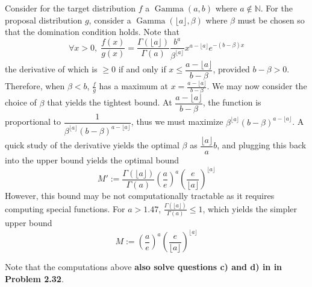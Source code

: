 \documentclass[a4paper,11pt]{article}
\begin{document}
\begin{enumerate}[label=(\alph*)]
  Consider for the target distribution $f$ a $\operatorname{Gamma}(a,b)$ where $a\notin \mathbb N$. For the proposal distribution $g$, consider a $\operatorname{Gamma}(\lfloor a \rfloor,\beta)$ where $\beta$ must be chosen so that the domination condition holds. Note that $$\forall x>0,\;\frac{f(x)}{g(x)}=\frac{\Gamma(\lfloor a \rfloor)}{\Gamma(a)}\frac{b^a}{\beta^{\lfloor a \rfloor}}x^{a-\lfloor a \rfloor}e^{-(b-\beta)x}$$ the derivative of which is $\geq 0$ if and only if $x\leq \dfrac{a-\lfloor a \rfloor}{b-\beta}$, provided $b-\beta >0$. Therefore, when $\beta<b$, $\frac fg$ has a maximum at $x=\frac{a-\lfloor a \rfloor}{b-\beta}$. We may now consider the choice of $\beta$ that yields the tightest bound. At $\dfrac{a-\lfloor a \rfloor}{b-\beta}$, the function is proportional to $\dfrac{1}{\beta^{\lfloor a \rfloor}(b-\beta)^{a-\lfloor a \rfloor}}$, thus we must maximize $\beta^{\lfloor a \rfloor}(b-\beta)^{a-\lfloor a \rfloor}$. A quick study of the derivative yields the optimal $\beta$ as $\dfrac{\lfloor a \rfloor}{a}b$, and plugging this back into the upper bound yields the optimal bound $$M':= \frac{\Gamma(\lfloor a \rfloor)}{\Gamma(a)} \left(\frac ae\right)^a \left(\frac e{\lfloor a \rfloor}\right)^{\lfloor a \rfloor}$$
  However, this bound may be not computationally tractable as it requires computing special functions. For $a>1.47$, $\frac{\Gamma(\lfloor a \rfloor)}{\Gamma(a)}\leq 1$, which yields the simpler upper bound $$M:= \left(\frac ae\right)^a \left(\frac e{\lfloor a \rfloor}\right)^{\lfloor a \rfloor}$$
  
  Note that the computations above \textbf{also solve questions c) and d) in in Problem 2.32}.


\end{enumerate}
\end{document}
